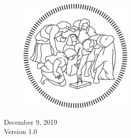 \documentclass[a4paper]{article}
\begin{document}
\begin{titlepage}
	
	\vfill\vfill\vfill
	
	\begin{figure}[H]
	\centering
	\includegraphics[width=0.5\textwidth]{polimi_logo}
	\end{figure}
	
	
	\vfill\vfill\vfill
	
	{\large December 9, 2019\\ Version 1.0} %
	
	\vfill
	
\end{titlepage}


\newpage
{}

\tableofcontents

\newpage
{}
\end{document}
